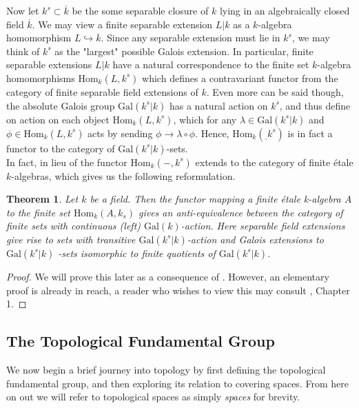 \documentclass{article}
\newtheorem{theorem}{Theorem}[section]
\theoremstyle{definition}
\theoremstyle{remark}
\begin{document}
Now let $k^s \subset \overline{k}$ be the some separable closure of $k$ lying in an algebraically closed field $\overline{k}$.
We may view a finite separable extension $L|k$ as a $k$-algebra homomorphism $L \hookrightarrow \overline{k}$. Since any separable extension must lie in $k^s$, we may think of $k^s$ as the "largest" possible Galois extension.
In particular, finite separable extensions $L|k$ have a natural correspondence to the finite set $k$-algebra homomorphisms $\text{Hom}_k(L, k^s)$
 which defines a contravariant functor from the category of finite separable field extensions of $k$.
 Even more can be said though, the absolute Galois group $\text{Gal}(k^s|k)$ has a natural action on $k^s$, and thus define on action on each object $\text{Hom}_k(L, k^s)$, which for any $\lambda \in \text{Gal}(k^s|k)$ and $\phi \in \text{Hom}_k(L, k^s)$ acts by sending $\phi \to \lambda \circ \phi$.
 Hence, $\text{Hom}_k(_, k^s)$ is in fact a functor to the category of $\text{Gal}(k^s|k)$-sets.\\
\indent In fact, in lieu of  the functor $\text{Hom}_k(-,k^s)$ extends to the category of finite \'etale $k$-algebras, which gives us the following reformulation.

\begin{theorem}
	Let $k$ be a field. 
	Then the functor mapping a finite \'etale k-algebra $A$ to the finite set $\text{Hom}_k(A, k_s)$ gives an anti-equivalence between the category of finite sets with continuous (left) $\text{Gal}(k)$-action.
	Here separable field extensions give rise to sets with transitive $\text{Gal}(k^s|k)$-action and Galois extensions to $\text{Gal}(k^s|k)$ -sets isomorphic to finite quotients of $\text{Gal}(k^s|k)$.
\end{theorem}

\begin{proof}
	We will prove this later as a consequence of . 
	However, an elementary proof is already in reach, a reader who wishes to view this may consult \cite{Szamuely}, Chapter 1.
\end{proof}

\subsection{The Topological Fundamental Group}
We now begin a brief journey into topology by first defining the topological fundamental group, and then exploring its relation to covering spaces.
From here on out we will refer to topological spaces as simply \textit{spaces} for brevity.
\end{document}
